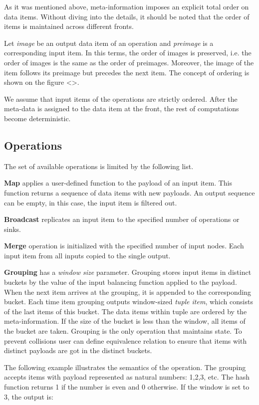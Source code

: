 As it was mentioned above, meta-information imposes an explicit total order on data items. Without diving into the details, it should be noted that the order of items is maintained across different fronts.

Let {\it image} be an output data item of an operation and {\it preimage} is a corresponding input item. In this terms, the order of images is preserved, i.e. the order of images is the same as the order of preimages. Moreover, the image of the item follows its preimage but precedes the next item. The concept of ordering is shown on the figure <>.

We assume that input items of the operations are strictly ordered. After the meta-data is assigned to the data item at the front, the rest of computations become deterministic.

\subsection{Operations}

The set of available operations is limited by the following list.

{\bf Map} applies a user-defined function to the payload of an input item. This function returns a sequence of data items with new payloads. An output sequence can be empty, in this case, the input item is filtered out.

{\bf Broadcast} replicates an input item to the specified number of operations or sinks. 

{\bf Merge} operation is initialized with the specified number of input nodes. Each input item from all inputs copied to the single output.

{\bf Grouping} has a {\it window size} parameter. Grouping stores input items in distinct buckets by the value of the input balancing function applied to the payload. When the next item arrives at the grouping, it is appended to the corresponding bucket. Each time item grouping outputs window-sized {\it tuple item}, which consists of the last items of this bucket. The data items within tuple are ordered by the meta-information. If the size of the bucket is less than the window, all items of the bucket are taken. Grouping is the only operation that maintains state. To prevent collisions user can define equivalence relation to ensure that items with distinct payloads are got in the distinct buckets.

The following example illustrates the semantics of the operation. The grouping accepts items with payload represented as natural numbers: 1,2,3, etc. The hash function returns 1 if the number is even and 0 otherwise. If the window is set to 3, the output is:

